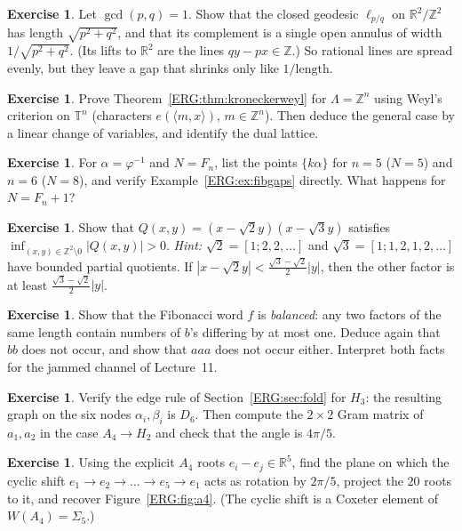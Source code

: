 \documentclass[11pt,openany]{book}
\theoremstyle{plain}
\theoremstyle{definition}
\newtheorem{exercise}[theorem]{Exercise}
\theoremstyle{remark}
\newcommand{\R}{\mathbb{R}}
\newcommand{\Z}{\mathbb{Z}}
\newcommand{\T}{\mathbb{T}}
\newcommand{\Lat}{\Lambda}             %
\newcommand{\abs}[1]{\left\lvert #1 \right\rvert}
\newcommand{\ip}[2]{\langle #1, #2\rangle}
\begin{document}
\begin{exercise}
Let $\gcd(p,q)=1$. Show that the closed geodesic $\ell_{p/q}$ on $\R^2/\Z^2$ has length $\sqrt{p^2+q^2}$,
and that its complement is a single open annulus of width $1/\sqrt{p^2+q^2}$. (Its lifts to $\R^2$ are the
lines $qy-px\in\Z$.) So rational lines are spread evenly, but they leave a gap that shrinks only like
$1/\text{length}$.
\end{exercise}

\begin{exercise}
Prove Theorem~\ref{ERG:thm:kroneckerweyl} for $\Lat=\Z^n$ using Weyl's criterion on $\T^n$ (characters
$e(\ip{m}{x})$, $m\in\Z^n$). Then deduce the general case by a linear change of variables, and identify
the dual lattice.
\end{exercise}

\begin{exercise}
For $\alpha=\varphi^{-1}$ and $N=F_n$, list the points $\{k\alpha\}$ for $n=5$ ($N=5$) and $n=6$
($N=8$), and verify Example~\ref{ERG:ex:fibgaps} directly. What happens for $N=F_n+1$?
\end{exercise}

\begin{exercise}\label{ERG:ex:oppenheim2}
Show that $Q(x,y)=(x-\sqrt2y)(x-\sqrt3y)$ satisfies $\inf_{(x,y)\in\Z^2\setminus0}\abs{Q(x,y)}>0$.
\emph{Hint:} $\sqrt2=[1;2,2,\dots]$ and $\sqrt3=[1;1,2,1,2,\dots]$ have bounded partial quotients. If
$\abs{x-\sqrt2y}<\frac{\sqrt3-\sqrt2}{2}\abs y$, then the other factor is at least
$\frac{\sqrt3-\sqrt2}{2}\abs y$.
\end{exercise}

\begin{exercise}
Show that the Fibonacci word $f$ is \emph{balanced}: any two factors of the same length contain numbers of
$b$'s differing by at most one. Deduce again that $bb$ does not occur, and show that $aaa$ does not occur
either. Interpret both facts for the jammed channel of Lecture~11.
\end{exercise}

\begin{exercise}
Verify the edge rule of Section~\ref{ERG:sec:fold} for $H_3$: the resulting graph on the
six nodes $\alpha_i,\beta_i$ is $D_6$. Then compute the $2\times2$ Gram matrix
of $a_1,a_2$ in the case $A_4\to H_2$ and check that the angle is $4\pi/5$.
\end{exercise}

\begin{exercise}
Using the explicit $A_4$ roots $e_i-e_j\in\R^5$, find the plane on which the cyclic shift
$e_1\to e_2\to\dots\to e_5\to e_1$ acts as rotation by $2\pi/5$, project the $20$ roots to it, and recover
Figure~\ref{ERG:fig:a4}. (The cyclic shift is a Coxeter element of $W(A_4)=\Sigma_5$.)
\end{exercise}
\end{document}
